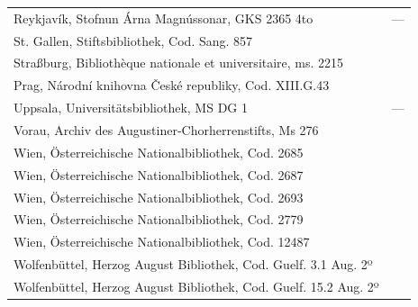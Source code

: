\noindent
\begin{tabularx}{\linewidth}{@{} >{\raggedright\arraybackslash}X l @{}}
Reykjavík, Stofnun Árna Magnússonar, GKS 2365 4to
	& ---%
	\\
St. Gallen, Stiftsbibliothek, Cod. Sang. 857
	& \autocite[1211]{hsc} \\
Straßburg, Bibliothèque nationale et universitaire, ms. 2215
	& \autocite[1828]{hsc} \\
Prag, Národní knihovna České republiky, Cod. XIII.G.43
	& \autocite[1168]{hsc} \\
Uppsala, Universitätsbibliothek, MS DG 1
	& ---%
	\\
Vorau, Archiv des Augustiner-Chorherrenstifts, Ms 276
	& \autocite[1432]{hsc} \\
Wien, Österreichische Nationalbibliothek, Cod. 2685
	& \autocite[2013]{hsc} \\
Wien, Österreichische Nationalbibliothek, Cod. 2687
	& \autocite[6494]{hsc} \\
Wien, Österreichische Nationalbibliothek, Cod. 2693
	& \autocite[1215]{hsc} \\
Wien, Österreichische Nationalbibliothek, Cod. 2779
	& \autocite[2693]{hsc} \\
Wien, Österreichische Nationalbibliothek, Cod. 12487
	& \autocite[3394]{hsc} \\
Wolfenbüttel, Herzog August Bibliothek, Cod. Guelf. 3.1 Aug. 2º
	& \autocite[8396]{hsc} \\
Wolfenbüttel, Herzog August Bibliothek, Cod. Guelf. 15.2 Aug. 2º
	& \autocite[6668]{hsc} \\
\end{tabularx}
